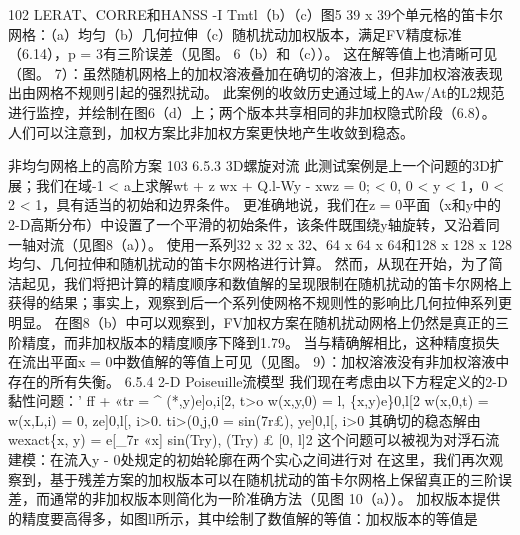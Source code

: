 \documentclass[UTF8,11pt,a4paper,openany,fontset=fandol]{ctexbook}
\begin{document}
102 LERAT、CORRE和HANSS -I Tmtl（b）（c）图5 39 x 39个单元格的笛卡尔网格：（a）均匀（b）几何拉伸（c）随机扰动加权版本，满足FV精度标准（6.14），p = 3有三阶误差（见图。 6（b）和（c））。 这在解等值上也清晰可见（图。 7）：虽然随机网格上的加权溶液叠加在确切的溶液上，但非加权溶液表现出由网格不规则引起的强烈扰动。 此案例的收敛历史通过域上的Aw/At的L2规范进行监控，并绘制在图6（d）上；两个版本共享相同的非加权隐式阶段（6.8）。 人们可以注意到，加权方案比非加权方案更快地产生收敛到稳态。

非均匀网格上的高阶方案 103 6.5.3 3D螺旋对流 此测试案例是上一个问题的3D扩展；我们在域-1 < a上求解wt + z wx + Q.l-Wy - xwz = 0; < 0, 0 < y < 1，0 < 2 < 1，具有适当的初始和边界条件。 更准确地说，我们在z = 0平面（x和y中的2-D高斯分布）中设置了一个平滑的初始条件，该条件既围绕y轴旋转，又沿着同一轴对流（见图8（a））。 使用一系列32 x 32 x 32、64 x 64 x 64和128 x 128 x 128均匀、几何拉伸和随机扰动的笛卡尔网格进行计算。 然而，从现在开始，为了简洁起见，我们将把计算的精度顺序和数值解的呈现限制在随机扰动的笛卡尔网格上获得的结果；事实上，观察到后一个系列使网格不规则性的影响比几何拉伸系列更明显。 在图8（b）中可以观察到，FV加权方案在随机扰动网格上仍然是真正的三阶精度，而非加权版本的精度顺序下降到1.79。 当与精确解相比，这种精度损失在流出平面x = 0中数值解的等值上可见（见图。 9）：加权溶液没有非加权溶液中存在的所有失衡。 6.5.4 2-D Poiseuille流模型 我们现在考虑由以下方程定义的2-D黏性问题：' ff + «tr = \textasciicircum{} (*,y)e]o,i[2, t>o w(x,y,0) = l, \{x,y)e\}0,l[2 w(x,0,t) = w(x,L,i) = 0, ze]0,l[, i>0. ti>(0,j,0 = sin(7r£), ye]0,l[, i>0 其确切的稳态解由wexact\{x, y) = e[\_7r «x] sin(Try), (Try) £ [0, l]2 这个问题可以被视为对浮石流建模：在流入y - 0处规定的初始轮廓在两个实心之间进行对 在这里，我们再次观察到，基于残差方案的加权版本可以在随机扰动的笛卡尔网格上保留真正的三阶误差，而通常的非加权版本则简化为一阶准确方法（见图 10（a））。 加权版本提供的精度要高得多，如图ll所示，其中绘制了数值解的等值：加权版本的等值是
\end{document}
